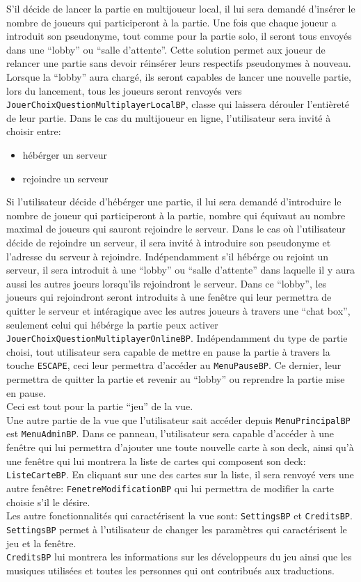 S'il décide de lancer la partie en multijoueur local, il lui sera demandé d'insérer le nombre de joueurs qui participeront à la partie.
Une fois que chaque joueur a introduit son pseudonyme, tout comme pour la partie solo, il seront tous envoyés dans une \enquote{lobby} ou \enquote{salle d'attente}.
Cette solution permet aux joueur de relancer une partie sans devoir réinsérer leurs respectifs pseudonymes à nouveau.
Lorsque la \enquote{lobby} aura chargé, ils seront capables de lancer une nouvelle partie, lors du lancement, tous les joueurs seront renvoyés vers \verb|JouerChoixQuestionMultiplayerLocalBP|, classe qui laissera dérouler l'entièreté de leur partie.
Dans le cas du multijoueur en ligne, l'utilisateur sera invité à choisir entre:
\begin{itemize}
\item hébérger un serveur
\item rejoindre un serveur
\end{itemize}
Si l'utilisateur décide d'hébérger une partie, il lui sera demandé d'introduire le nombre de joueur qui participeront à la partie, nombre qui équivaut au nombre maximal de joueurs qui sauront rejoindre le serveur.
Dans le cas où l'utilisateur décide de rejoindre un serveur, il sera invité à introduire son pseudonyme et l'adresse du serveur à rejoindre.
Indépendamment s'il hébérge ou rejoint un serveur, il sera introduit à une \enquote{lobby} ou \enquote{salle d'attente} dans laquelle il y aura aussi les autres joeurs lorsqu'ils rejoindront le serveur.
Dans ce \enquote{lobby}, les joueurs qui rejoindront seront introduits à une fenêtre qui leur permettra de quitter le serveur et intéragique avec les autres joueurs à travers une \enquote{chat box}, seulement celui qui hébérge la partie peux activer \verb|JouerChoixQuestionMultiplayerOnlineBP|.
Indépendamment du type de partie choisi, tout utilisateur sera capable de mettre en pause la partie à travers la touche \verb|ESCAPE|, ceci leur permettra d'accéder au \verb|MenuPauseBP|.
Ce dernier, leur permettra de quitter la partie et revenir au \enquote{lobby} ou reprendre la partie mise en pause.\\
Ceci est tout pour la partie \enquote{jeu} de la vue.\\
Une autre partie de la vue que l'utilisateur sait accéder depuis \verb|MenuPrincipalBP| est \verb|MenuAdminBP|.
Dans ce panneau, l'utilisateur sera capable d'accéder à une fenêtre qui lui permettra d'ajouter une toute nouvelle carte à son deck, ainsi qu'à une fenêtre qui lui montrera la liste de cartes qui composent son deck: \verb|ListeCarteBP|.
En cliquant sur une des cartes sur la liste, il sera renvoyé vers une autre fenêtre: \verb|FenetreModificationBP| qui lui permettra de modifier la carte choisie s'il le désire.\\
Les autre fonctionnalités qui caractérisent la vue sont: \verb|SettingsBP| et \verb|CreditsBP|.
\verb|SettingsBP| permet à l'utilisateur de changer les paramètres qui caractérisent le jeu et la fenêtre.\\
\verb|CreditsBP| lui montrera les informations sur les développeurs du jeu ainsi que les musiques utilisées et toutes les personnes qui ont contribués aux traductions.

